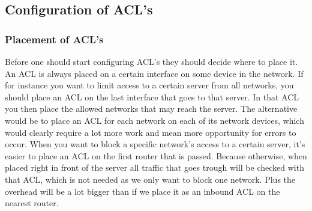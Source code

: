  \subsection{Configuration of ACL's}
 \subsubsection{Placement of ACL's}
 Before one should start configuring ACL's they should decide where to place it. An ACL is always placed on a certain interface on some device in the network. If for instance you want to limit access to a certain server from all networks, you should place an ACL on the last interface that goes to that server. In that ACL you then place the allowed networks that may reach the server. The alternative would be to place an ACL for each network on each of its network devices, which would clearly require a lot more work and mean more opportunity for errors to occur. When you want to block a specific network's access to a certain server, it's easier to place an ACL on the first router that is passed. Because otherwise, when placed right in front of the server all traffic that goes trough will be checked with that ACL, which is not needed as we only want to block one network. Plus the overhead will be a lot bigger than if we place it as an inbound ACL on the nearest router.
